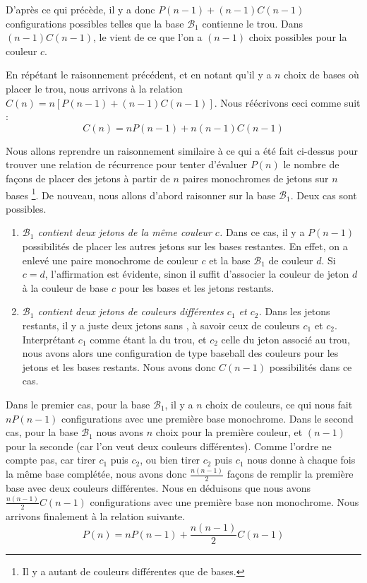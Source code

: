 D'après ce qui précède, il y a donc $P(n - 1) + (n-1) C(n-1)$ configurations possibles telles que la base $\mathcal{B}_1$ contienne le trou. Dans $(n-1) C(n-1)$, le  vient de ce que l'on a $(n-1)$ choix possibles pour la couleur $c$.


\medskip

En répétant le raisonnement précédent, et en notant qu'il y a $n$ choix de bases où placer le trou, nous arrivons à la relation $C(n) = n \left[ P(n - 1) + (n-1) C(n-1) \right]$. Nous réécrivons ceci comme suit :
\begin{equation}
    C(n) = n P(n - 1) + n(n-1) C(n-1)
\end{equation}


Nous allons reprendre un raisonnement similaire à ce qui a été fait ci-dessus pour trouver une relation de récurrence pour tenter d'évaluer $P(n)$ le nombre de façons de placer des jetons à partir de $n$ paires monochromes de jetons sur $n$ bases
\footnote{
   Il y a autant de couleurs différentes que de bases.
}.
De nouveau, nous allons d'abord raisonner sur la base $\mathcal{B}_1$. Deux cas sont possibles.

\begin{enumerate}
    \item \textit{$\mathcal{B}_1$ contient deux jetons de la même couleur $c$.}
    Dans ce cas, il y a $P(n - 1)$ possibilités de placer les autres jetons sur les bases restantes. En effet, on a enlevé une paire monochrome de couleur $c$ et la base $\mathcal{B}_1$ de couleur $d$. Si $c = d$, l'affirmation est évidente, sinon il suffit d'associer la couleur de jeton $d$ à la couleur de base $c$ pour les bases et les jetons restants.

    \item \textit{$\mathcal{B}_1$ contient deux jetons de couleurs différentes $c_1$ et $c_2$.}
    Dans les jetons restants, il y a juste deux jetons sans , à savoir ceux de couleurs $c_1$ et $c_2$. Interprétant $c_1$ comme étant la  du trou, et $c_2$ celle du jeton associé au trou, nous avons alors une configuration de type baseball des couleurs pour les jetons et les bases restants. Nous avons donc $C(n - 1)$ possibilités dans ce cas.
\end{enumerate}


\medskip

Dans le premier cas, pour la base $\mathcal{B}_1$, il y a $n$ choix de couleurs, ce qui nous fait $n P(n - 1)$ configurations avec une première base monochrome.
Dans le second cas, pour la base $\mathcal{B}_1$ nous avons $n$ choix pour la première couleur, et $(n - 1)$ pour la seconde (car l'on veut deux couleurs différentes).
Comme l'ordre ne compte pas, car tirer $c_1$ puis $c_2$, ou bien tirer $c_2$ puis $c_1$ nous donne à chaque fois la même base complétée, nous avons donc $\frac{n(n - 1)}{2}$ façons de remplir la première base avec deux couleurs différentes.
Nous en déduisons que nous avons $\frac{n(n-1)}{2} C(n - 1)$ configurations avec une première base non monochrome.
Nous arrivons finalement à la relation suivante.
\begin{equation}
    P(n) = n P(n - 1) + \dfrac{n(n-1)}{2} C(n - 1)
\end{equation}


